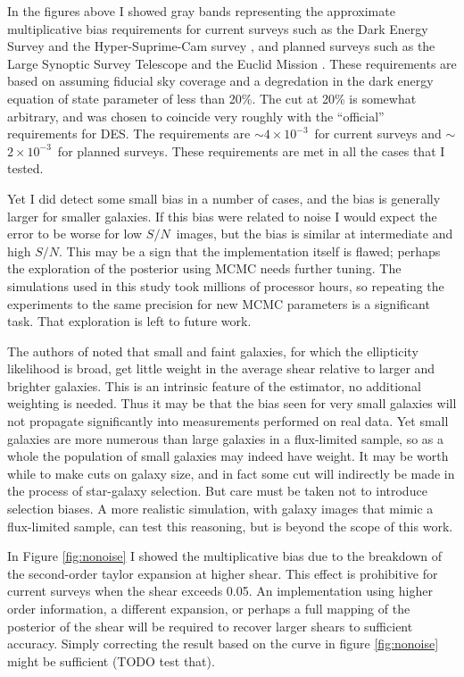 \documentclass[12pt,preprint]{aastex}
\newcommand{\sn}{$S/N$}
\newcommand{\desreq}{$4\times 10^{-3}$}
\newcommand{\lsstreq}{$2\times 10^{-3}$}
\begin{document}
In the figures above I showed gray bands representing the approximate
multiplicative bias requirements for current surveys such as the Dark Energy
Survey \citep[][DES]{DESWhitePaper} and the Hyper-Suprime-Cam survey
\citep[][HSC]{HSC12}, and planned surveys such as the Large Synoptic Survey
Telescope \citep[][LSST]{IvezicLSST08} and the Euclid Mission
\citep{Euclid2011}.  These requirements are based on
\citep{HutererSystematics06} assuming fiducial sky coverage and a degredation
in the dark energy equation of state parameter of less than 20\%.  The cut at
20\% is somewhat arbitrary, and was chosen to coincide very roughly with the
``official'' requirements for DES. The requirements are $\sim$\desreq\ for
current surveys and $\sim$\lsstreq\ for planned surveys.  These requirements
are met in all the cases that I tested.

Yet I did detect some small bias in a number of cases, and the bias is
generally larger for smaller galaxies.  If this bias were related to noise I
would expect the error to be worse for low \sn\ images, but the bias is similar
at intermediate and high \sn.  This may be a sign that the implementation
itself is flawed; perhaps the exploration of the posterior using MCMC needs
further tuning.  The simulations used in this study took millions of processor
hours, so repeating the experiments to the same precision for new MCMC
parameters is a significant task.  That exploration is left to future work.

The authors of \cite{ba14} noted that small and faint galaxies, for which the
ellipticity likelihood is broad, get little weight in the average shear
relative to larger and brighter galaxies.  This is an intrinsic feature of the
estimator, no additional weighting is needed.  Thus it may be that the bias
seen for very small galaxies will not propagate significantly into measurements
performed on real data.  Yet small galaxies are more numerous than large
galaxies in a flux-limited sample, so as a whole the population of small
galaxies may indeed have weight.  It may be worth while to make cuts on galaxy
size, and in fact some cut will indirectly be made in the process of
star-galaxy selection.  But care must be taken not to introduce selection
biases. A more realistic simulation, with galaxy images that mimic a
flux-limited sample, can test this reasoning, but is beyond the scope of this
work.

In Figure \ref{fig:nonoise} I showed the multiplicative bias due to the
breakdown of the second-order taylor expansion at higher shear.   This effect
is prohibitive for current surveys when the shear exceeds 0.05.  An
implementation using higher order information, a different expansion, or
perhaps a full mapping of the posterior of the shear will be required to
recover larger shears to sufficient accuracy.  Simply correcting the result
based on the curve in figure \ref{fig:nonoise} might be sufficient (TODO test
that).
\end{document}
